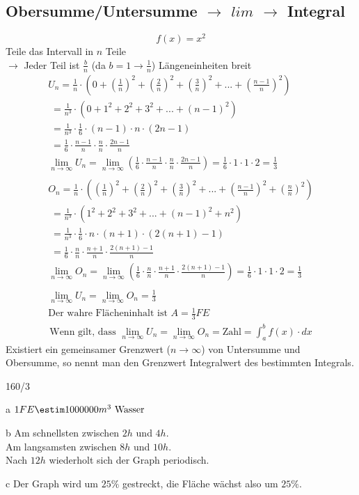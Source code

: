 \subsection{Obersumme/Untersumme $\rightarrow$ $lim$ $\rightarrow$ Integral}
$$f(x) = x^2$$
Teile das Intervall in $n$ Teile \\
\gap $\rightarrow$ Jeder Teil ist $\frac{b}{n}$ (da $b = 1 \rightarrow \frac{1}{n}$) Längeneinheiten breit
\begin{gather*}
  U_n = \frac{1}{n} \cdot (0 + (\frac{1}{n})^2 + (\frac{2}{n})^2 + (\frac{3}{n})^2 + ... + (\frac{n-1}{n})^2) \\
  \;= \frac{1}{n^3} \cdot (0 + 1^2 + 2^2 + 3^2 + ... + (n-1)^2) \\
  \;= \frac{1}{n^3} \cdot \frac{1}{6} \cdot (n - 1) \cdot n \cdot (2n - 1) \\
  \;= \frac{1}{6} \cdot \frac{n - 1}{n} \cdot \frac{n}{n} \cdot \frac{2n - 1}{n} \\
  \lim\limits_{n \to \infty} U_n = \lim\limits_{n \to \infty} (\frac{1}{6} \cdot \frac{n - 1}{n} \cdot \frac{n}{n} \cdot \frac{2n - 1}{n}) = \frac{1}{6} \cdot 1 \cdot 1 \cdot 2 = \frac{1}{3} \\\\
  O_n = \frac{1}{n} \cdot ((\frac{1}{n})^2 + (\frac{2}{n})^2 + (\frac{3}{n})^2 + ... + (\frac{n-1}{n})^2 + (\frac{n}{n})^2) \\
  \;= \frac{1}{n^3} \cdot (1^2 + 2^2 + 3^2 + ... + (n-1)^2 + n^2) \\
  \;= \frac{1}{n^3} \cdot \frac{1}{6} \cdot n \cdot (n + 1) \cdot (2(n + 1) - 1) \\
  \;= \frac{1}{6} \cdot \frac{n}{n} \cdot \frac{n + 1}{n} \cdot \frac{2(n + 1) - 1}{n} \\
  \lim\limits_{n \to \infty} O_n = \lim\limits_{n \to \infty} (\frac{1}{6} \cdot \frac{n}{n} \cdot \frac{n + 1}{n} \cdot \frac{2(n + 1) - 1}{n}) = \frac{1}{6} \cdot 1 \cdot 1 \cdot 2 = \frac{1}{3} \\\\
  \lim\limits_{n \to \infty} U_n = \lim\limits_{n \to \infty} O_n = \frac{1}{3} \\
  \text{Der wahre Flächeninhalt ist $A = \frac{1}{3}FE$}
\end{gather*}
\begin{gather*}
  \text{Wenn gilt, dass } \lim\limits_{n \to \infty} U_n = \lim\limits_{n \to \infty} O_n = \text{Zahl} = \int_a^b f(x) \cdot dx
\end{gather*}
Existiert ein gemeinsamer Grenzwert ($n \to \infty$) von Untersumme und Obersumme, so nennt man den Grenzwert Integralwert des bestimmten Integrals.
\begin{exercise}{160/3}
  \item [a]
  $1FE \estim 1000000m^3 \text{ Wasser}$
  \item [b]
  Am schnellsten zwischen $2h$ und $4h$. \\
  Am langsamsten zwischen $8h$ und $10h$. \\
  Nach $12h$ wiederholt sich der Graph periodisch.
  \item [c]
  Der Graph wird um $25\%$ gestreckt, die Fläche wächst also um $25\%$.
\end{exercise}
